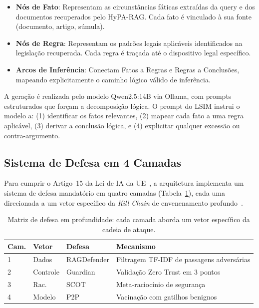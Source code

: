 \documentclass[journal,10pt]{IEEEtran}
\begin{document}
\begin{itemize}    \item \textbf{N\'{o}s de Fato}: Representam as circunst\^{a}ncias f\'{a}ticas extra\'{i}das da query e dos documentos recuperados pelo HyPA-RAG. Cada fato \'{e} vinculado \`{a} sua fonte (documento, artigo, s\'{u}mula).
    \item \textbf{N\'{o}s de Regra}: Representam os padr\~{o}es legais aplic\'{a}veis identificados na legisla\c{c}\~{a}o recuperada. Cada regra \'{e} tra\c{c}ada at\'{e} o dispositivo legal espec\'{i}fico.
    \item \textbf{Arcos de Infer\^{e}ncia}: Conectam Fatos a Regras e Regras a Conclus\~{o}es, mapeando explicitamente o caminho l\'{o}gico v\'{a}lido de infer\^{e}ncia.
\end{itemize}

A gera\c{c}\~{a}o \'{e} realizada pelo modelo Qwen2.5:14B via Ollama, com prompts estruturados que for\c{c}am a decomposi\c{c}\~{a}o l\'{o}gica. O prompt do LSIM instrui o modelo a: (1) identificar os fatos relevantes, (2) mapear cada fato a uma regra aplic\'{a}vel, (3) derivar a conclus\~{a}o l\'{o}gica, e (4) explicitar qualquer excess\~{a}o ou contra-argumento.

\subsection{Sistema de Defesa em 4 Camadas}

Para cumprir o Artigo~15 da Lei de IA da UE~\cite{euaiact2024}, a arquitetura implementa um sistema de defesa mandat\'{o}rio em quatro camadas (Tabela~\ref{tab:defense}), cada uma direcionada a um vetor espec\'{i}fico da \textit{Kill Chain} de envenenamento profundo~\cite{rescue2025a}.

\begin{table}[!t]
\centering
\caption{Matriz de defesa em profundidade: cada camada aborda um vetor espec\'{i}fico da cadeia de ataque.}
\label{tab:defense}
\small
\begin{tabular}{p{0.8cm}p{1.5cm}p{1.5cm}p{2.8cm}}
\toprule
\textbf{Cam.} & \textbf{Vetor} & \textbf{Defesa} & \textbf{Mecanismo} \\
\midrule
1 & Dados & RAGDefender & Filtragem TF-IDF de passagens advers\'{a}rias \\
2 & Controle & Guardian & Valida\c{c}\~{a}o Zero Trust em 3 pontos \\
3 & Rac. & SCOT & Meta-racioc\'{i}nio de seguran\c{c}a \\
4 & Modelo & P2P & Vacina\c{c}\~{a}o com gatilhos benignos \\
\bottomrule
\end{tabular}
\end{table}
\end{document}

